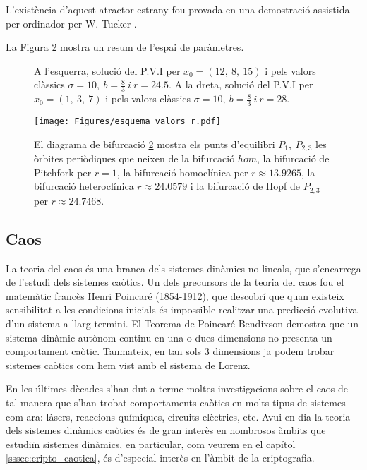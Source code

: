 \documentclass[11pt,a4paper,openright,oneside]{article}
\numberwithin{equation}{section}
\theoremstyle{definition}
\begin{document}
L'existència d'aquest atractor estrany fou provada en una demostració assistida per ordinador per W. Tucker \cite{Tucker}.

La Figura \ref{fig:esquema_valors_r} mostra un resum de l'espai de paràmetres.

\begin{figure}[htbp]
    \centering
    \qquad
    \caption{A l'esquerra, solució del P.V.I per $x_0=(12, \ 8, \ 15)$ i pels valors clàssics $\sigma = 10, \ b=\frac{8}{3} \ i \ r=24.5$. A la dreta, solució del P.V.I per $x_0=(1, \ 3, \ 7)$ i pels valors clàssics $\sigma = 10, \ b=\frac{8}{3} \ i \ r=28$.}
    \label{fig:r_caotic}
\end{figure} 

\begin{figure}[htpb]
    \centering
    \texttt{[image: Figures/esquema\_valors\_r.pdf]}
    \caption{El diagrama de bifurcació \ref{fig:esquema_valors_r} mostra els punts d'equilibri $P_1, \ P_{2,3}$ les òrbites periòdiques que neixen de la bifurcació $hom$, la bifurcació de Pitchfork per $r=1$, la bifurcació homoclínica per $r\approx 13.9265$, la bifurcació heteroclínica $r\approx 24.0579$ i la bifurcació de Hopf de $P_{2,3}$ per $r\approx 24.7468$.}
    \label{fig:esquema_valors_r}
\end{figure}

\subsection{Caos}\label{sssec:caos}

La teoria del caos és una branca dels sistemes dinàmics no lineals, que s'encarrega de l'estudi dels sistemes caòtics. Un dels precursors de la teoria del caos fou el matemàtic francès Henri Poincaré (1854-1912), que descobrí que quan existeix sensibilitat a les condicions inicials és impossible realitzar una predicció evolutiva d'un sistema a llarg termini. El Teorema de Poincaré-Bendixson demostra que un sistema dinàmic autònom continu en una o dues dimensions no presenta un comportament caòtic. Tanmateix, en tan sols 3 dimensions ja podem trobar sistemes caòtics com hem vist amb el sistema de Lorenz.

En les últimes dècades s'han dut a terme moltes investigacions sobre el caos de tal manera que s'han trobat comportaments caòtics en molts tipus de sistemes com ara: làsers, reaccions químiques, circuits elèctrics, etc. Avui en dia la teoria dels sistemes dinàmics caòtics és de gran interès en nombrosos àmbits que estudiïn sistemes dinàmics, en particular, com veurem en el capítol \ref{sssec:cripto_caotica}, és d'especial interès en l'àmbit de la criptografia.
\end{document}
